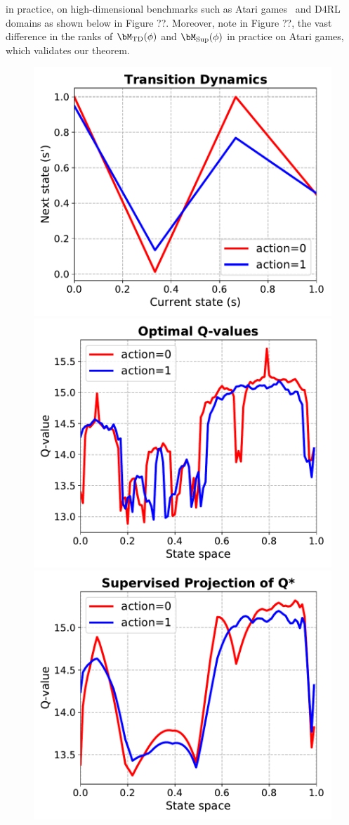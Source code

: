 in practice, on high-dimensional benchmarks such as Atari games~\citep{bellemare2013ale} and D4RL~\citep{fu2020d4rl} domains as shown below in Figure ??. Moreover, note in Figure ??, the vast difference in the ranks of $\bM_\mathrm{TD}(\phi)$ and $\bM_\mathrm{Sup}(\phi)$ in practice on Atari games, which validates our theorem.


\begin{figure}
    \centering
    \vspace{-20pt}
    \includegraphics[width=0.48\linewidth]{section3_figs/dynamics.pdf}
    \includegraphics[width=0.48\linewidth]{section3_figs/optimal_q.pdf}
    \includegraphics[width=0.48\linewidth]{section3_figs/supervised_q.pdf}

\end{figure}
